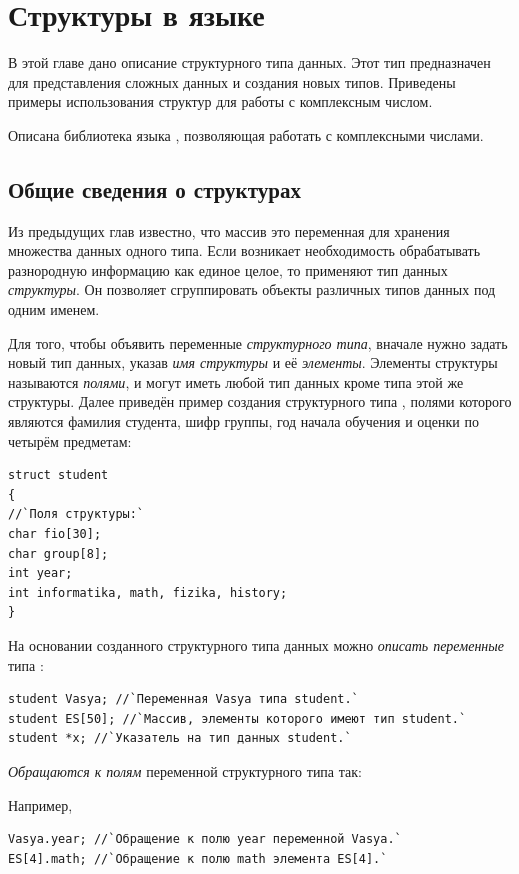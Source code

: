\chapter[Структуры в языке \Sys{C++}]{Структуры в языке }\label{ch09}
В этой главе дано описание структурного типа данных. Этот тип предназначен для представления сложных данных и создания
новых типов. Приведены примеры использования структур для работы с комплексным числом.

Описана библиотека языка , позволяющая работать с комплексными числами.

\section[Общие сведения о структурах]{Общие сведения о структурах}
Из предыдущих глав известно, что массив это переменная для хранения множества данных одного типа. Если возникает
необходимость обрабатывать  разнородную информацию как единое целое, то применяют тип данных
\emph{структуры}. Он позволяет сгруппировать объекты различных типов данных под одним
именем.

Для того, чтобы объявить переменные \emph{структурного типа}, вначале нужно задать новый тип данных, указав
\emph{имя структуры} и её \emph{элементы}. Элементы структуры называются
\emph{полями}, и могут иметь любой тип данных кроме типа этой же структуры. Далее приведён пример создания
структурного типа , полями которого являются фамилия студента, шифр группы, год начала
обучения и оценки по четырём предметам:

\begin{lstlisting}
struct student
{
//`Поля структуры:`
char fio[30];
char group[8];
int year; 
int informatika, math, fizika, history;
}
\end{lstlisting}

На основании созданного структурного типа данных можно \emph{описать переменные}  типа
:

\begin{lstlisting}
student Vasya; //`Переменная Vasya типа student.`
student ES[50]; //`Массив, элементы которого имеют тип student.`
student *x; //`Указатель на тип данных student.`
\end{lstlisting}

\emph{Обращаются к полям} переменной структурного типа так: 


Например, 
\begin{lstlisting}
Vasya.year; //`Обращение к полю year переменной Vasya.`
ES[4].math; //`Обращение к полю math элемента ES[4].`
\end{lstlisting}

